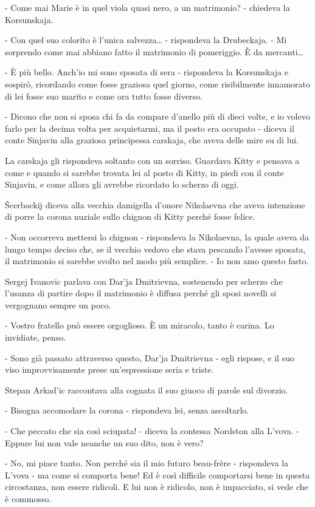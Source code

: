 - Come mai Marie è in quel viola quasi nero, a un matrimonio? - chiedeva la Korsunskaja. 

- Con quel suo colorito è l'unica salvezza\ldots{} - rispondeva la Drubeckaja. - Mi sorprendo come mai abbiano fatto il matrimonio di pomeriggio. È da mercanti\ldots{} 

- È più bello. Anch'io mi sono sposata di sera - rispondeva la Korsunskaja e sospirò, ricordando come fosse graziosa quel giorno, come risibilmente innamorato di lei fosse suo marito e come ora tutto fosse diverso. 

- Dicono che non si sposa chi fa da compare d'anello più di dieci volte, e io volevo farlo per la decima volta per acquietarmi, ma il posto era occupato - diceva il conte Sinjavin alla graziosa principessa carskaja, che aveva delle mire su di lui. 

La carskaja gli rispondeva soltanto con un sorriso. Guardava Kitty e pensava a come e quando si sarebbe trovata lei al posto di Kitty, in piedi con il conte Sinjavin, e come allora gli avrebbe ricordato lo scherzo di oggi. 

Šcerbackij diceva alla vecchia damigella d'onore Nikolaevna che aveva intenzione di porre la corona nuziale sullo chignon di Kitty perché fosse felice. 

- Non occorreva mettersi lo chignon - rispondeva la Nikolaevna, la quale aveva da lungo tempo deciso che, se il vecchio vedovo che stava pescando l'avesse sposata, il matrimonio si sarebbe svolto nel modo più semplice. - Io non amo questo fasto. 

Sergej Ivanovic parlava con Dar'ja Dmitrievna, sostenendo per scherzo che l'usanza di partire dopo il matrimonio è diffusa perché gli sposi novelli si vergognano sempre un poco. 

- Vostro fratello può essere orgoglioso. È un miracolo, tanto è carina. Lo invidiate, penso. 

- Sono già passato attraverso questo, Dar'ja Dmitrievna - egli rispose, e il suo viso improvvisamente prese un'espressione seria e triste. 

Stepan Arkad'ic raccontava alla cognata il suo giuoco di parole sul divorzio. 

- Bisogna accomodare la corona - rispondeva lei, senza ascoltarlo. 

- Che peccato che sia così sciupata! - diceva la contessa Nordston alla L'vova. - Eppure lui non vale neanche un suo dito, non è vero? 

- No, mi piace tanto. Non perché sia il mio futuro beau-frère - rispondeva la L'vova - ma come si comporta bene! Ed è così difficile comportarsi bene in questa circostanza, non essere ridicoli. E lui non è ridicolo, non è impacciato, si vede che è commosso. 

